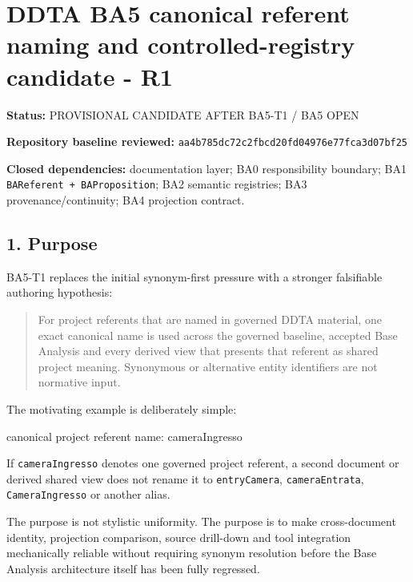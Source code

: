\documentclass[
  10pt,
  a4paper,
]{article}
\author{}
\date{}
\newenvironment{Shaded}{}{}
\newcommand{\NormalTok}[1]{#1}
\begin{document}
\section{DDTA BA5 canonical referent naming and controlled-registry
candidate -
R1}\label{ddta-ba5-canonical-referent-naming-and-controlled-registry-candidate---r1}

\textbf{Status:} PROVISIONAL CANDIDATE AFTER BA5-T1 / BA5 OPEN

\textbf{Repository baseline reviewed:}
\texttt{aa4b785dc72c2fbcd20fd04976e77fca3d07bf25}

\textbf{Closed dependencies:} documentation layer; BA0 responsibility
boundary; BA1 \texttt{BAReferent\ +\ BAProposition}; BA2 semantic
registries; BA3 provenance/continuity; BA4 projection contract.

\subsection{1. Purpose}\label{purpose}

BA5-T1 replaces the initial synonym-first pressure with a stronger
falsifiable authoring hypothesis:

\begin{quote}
For project referents that are named in governed DDTA material, one
exact canonical name is used across the governed baseline, accepted Base
Analysis and every derived view that presents that referent as shared
project meaning. Synonymous or alternative entity identifiers are not
normative input.
\end{quote}

The motivating example is deliberately simple:

\begin{Shaded}
\begin{Highlighting}[]
\NormalTok{canonical project referent name:}
\NormalTok{  cameraIngresso}
\end{Highlighting}
\end{Shaded}

If \texttt{cameraIngresso} denotes one governed project referent, a
second document or derived shared view does not rename it to
\texttt{entryCamera}, \texttt{cameraEntrata}, \texttt{CameraIngresso} or
another alias.

The purpose is not stylistic uniformity. The purpose is to make
cross-document identity, projection comparison, source drill-down and
tool integration mechanically reliable without requiring synonym
resolution before the Base Analysis architecture itself has been fully
regressed.
\end{document}
